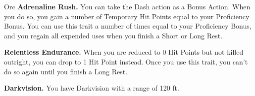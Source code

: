 \begin{Card}[Species]{Orc}
\textbf{Adrenaline Rush.} You can take the Dash action as a Bonus Action. When you do so, you gain a number of Temporary Hit Points equal to your Proficiency Bonus. You can use this trait a number of times equal to your Proficiency Bonus, and you regain all expended uses when you finish a Short or Long Rest.

\textbf{Relentless Endurance.} When you are reduced to 0 Hit Points but not killed outright, you can drop to 1 Hit Point instead. Once you use this trait, you can't do so again until you finish a Long Rest.

\textbf{Darkvision.} You have Darkvision with a range of 120 ft.
\end{Card}


